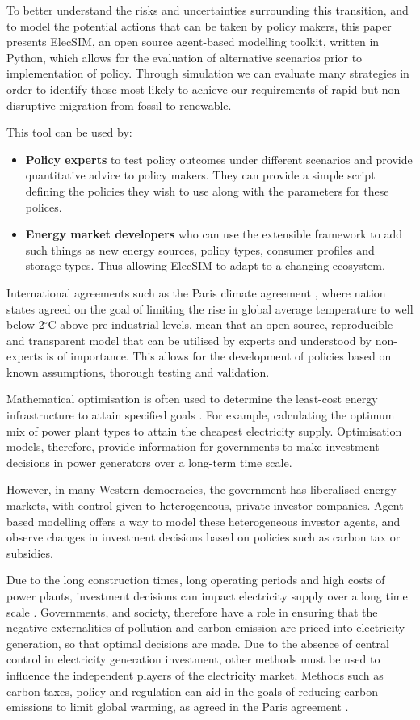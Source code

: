 To better understand the risks and uncertainties surrounding this transition, and to model the potential actions that can be taken by policy makers, this paper presents ElecSIM, an open source agent-based modelling toolkit, written in Python, which allows for the evaluation of alternative scenarios prior to implementation of policy. Through simulation we can evaluate many strategies in order to identify those most likely to achieve our requirements of rapid but non-disruptive migration from fossil to renewable.

This tool can be used by:
\begin{itemize}
	\item {\bf Policy experts} to test policy outcomes under different scenarios and provide quantitative advice to policy makers. They can provide a simple script defining the policies they wish to use along with the parameters for these polices.
	\item {\bf Energy market developers} who can use the extensible framework to add such things as new energy sources, policy types, consumer profiles and storage types. Thus allowing ElecSIM to adapt to a changing ecosystem.
\end{itemize}
International agreements such as the Paris climate agreement \cite{May2002}, where nation states agreed on the goal of limiting the rise in global average temperature to well below 2$^\circ$C above pre-industrial levels, mean that an open-source, reproducible and transparent model that can be utilised by experts and understood by non-experts is of importance. This allows for the development of policies based on known assumptions, thorough testing and validation.

Mathematical optimisation is often used to determine the least-cost energy infrastructure to attain specified goals \cite{Papadelis2012}. For example, calculating the optimum mix of power plant types to attain the cheapest electricity supply. Optimisation models, therefore, provide information for governments to make investment decisions in power generators over a long-term time scale. 

However, in many Western democracies, the government has liberalised energy markets, with control given to heterogeneous, private investor companies. Agent-based modelling offers a way to model these heterogeneous investor agents, and observe changes in investment decisions based on policies such as carbon tax or subsidies.

Due to the long construction times, long operating periods and high costs of power plants, investment decisions can impact electricity supply over a long time scale \cite{Chappin2017}. Governments, and society, therefore have a role in ensuring that the negative externalities of pollution and carbon emission are priced into electricity generation, so that optimal decisions are made. Due to the absence of central control in electricity generation investment, other methods must be used to influence the independent players of the electricity market. Methods such as carbon taxes, policy and regulation can aid in the goals of reducing carbon emissions to limit global warming, as agreed in the Paris agreement \cite{May2002}.

